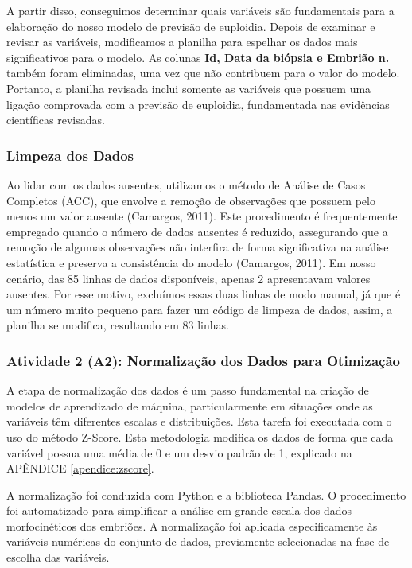 A partir disso, conseguimos determinar quais variáveis são fundamentais para a elaboração do nosso modelo de previsão de euploidia. Depois de examinar e revisar as variáveis, modificamos a planilha para espelhar os dados mais significativos para o modelo. As colunas \textbf{Id, Data da biópsia e Embrião n.} também foram eliminadas, uma vez que não contribuem para o valor do modelo. Portanto, a planilha revisada inclui somente as variáveis que possuem uma ligação comprovada com a previsão de euploidia, fundamentada nas evidências científicas revisadas.

\subsubsection{Limpeza dos Dados}
Ao lidar com os dados ausentes, utilizamos o método de Análise de Casos Completos (ACC), que envolve a remoção de observações que possuem pelo menos um valor ausente (Camargos, 2011). Este procedimento é frequentemente empregado quando o número de dados ausentes é reduzido, assegurando que a remoção de algumas observações não interfira de forma significativa na análise estatística e preserva a consistência do modelo (Camargos, 2011). Em nosso cenário, das 85 linhas de dados disponíveis, apenas 2 apresentavam valores ausentes. Por esse motivo, excluímos essas duas linhas de modo manual, já que é um número muito pequeno para fazer um código de limpeza de dados, assim, a planilha se modifica, resultando em 83 linhas.

\subsubsection{Atividade 2 (A2): Normalização dos Dados para Otimização}
A etapa de normalização dos dados é um passo fundamental na criação de modelos de aprendizado de máquina, particularmente em situações onde as variáveis têm diferentes escalas e distribuições. Esta tarefa foi executada com o uso do método Z-Score. Esta metodologia modifica os dados de forma que cada variável possua uma média de 0 e um desvio padrão de 1, explicado na APÊNDICE \ref{apendice:zscore}. 

A normalização foi conduzida com Python e a biblioteca Pandas. O procedimento foi automatizado para simplificar a análise em grande escala dos dados morfocinéticos dos embriões. A normalização foi aplicada especificamente às variáveis numéricas do conjunto de dados, previamente selecionadas na fase de escolha das variáveis. 

